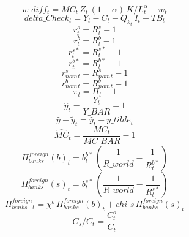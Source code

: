 \documentclass[10pt,a4paper]{article}
\begin{document}
\begin{dmath}
w\_diff_{t}=MC_{t}\, Z_{t}\, \left(1-\alpha \right)\, K/L_{t}^{\alpha }-w_{t}
\end{dmath}
\begin{dmath}
delta\_Check_{t}=Y_{t}-C_{t}- Q_k _{t}\, I_{t}-TB_{t}
\end{dmath}
\begin{dmath}
r^s_{t}=R^s_{t}-1
\end{dmath}
\begin{dmath}
r^b_{t}=R^b_{t}-1
\end{dmath}
\begin{dmath}
r^{s*}_{t}=R^{s*}_{t}-1
\end{dmath}
\begin{dmath}
r^{b*}_{t}=R^{b*}_{t}-1
\end{dmath}
\begin{dmath}
 r^s_{nom}_{t}= R^s_{nom}_{t}-1
\end{dmath}
\begin{dmath}
 r^b_{nom}_{t}= R^b_{nom}_{t}-1
\end{dmath}
\begin{dmath}
 \pi _{t}= \Pi _{t}-1
\end{dmath}
\begin{dmath}
 \hat{y} _{t}=\frac{Y_{t}}{Y\_BAR}-1
\end{dmath}
\begin{dmath}
 \hat{y} - \tilde{y} _{t}= \hat{y} _{t}-y\_tilde_{t}
\end{dmath}
\begin{dmath}
 \hat{MC} _{t}=\frac{MC_{t}}{MC\_BAR}-1
\end{dmath}
\begin{dmath}
\Pi^{foreign}_{banks}(b)_{t}=b^{b*}_{t}\, \left(\frac{1}{R\_world}-\frac{1}{R^{b*}_{t}}\right)
\end{dmath}
\begin{dmath}
\Pi^{foreign}_{banks}(s)_{t}=b^{s*}_{t}\, \left(\frac{1}{R\_world}-\frac{1}{R^{s*}_{t}}\right)
\end{dmath}
\begin{dmath}
\Pi^{foreign}_{banks}_{t}=\chi^b \, \Pi^{foreign}_{banks}(b)_{t}+chi\_s\, \Pi^{foreign}_{banks}(s)_{t}
\end{dmath}
\begin{dmath}
 C_s / C  _{t}=\frac{C^s_{t}}{C_{t}}
\end{dmath}
\end{document}
